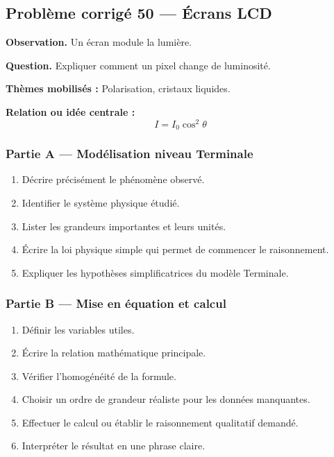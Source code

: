 \documentclass[11pt,a4paper]{article}
\begin{document}
\subsection{Problème corrigé 50 — Écrans LCD}

\begin{exercicebox}
\textbf{Observation.} Un écran module la lumière.

\medskip
\textbf{Question.} Expliquer comment un pixel change de luminosité.

\medskip
\textbf{Thèmes mobilisés :} Polarisation, cristaux liquides.

\medskip
\textbf{Relation ou idée centrale :}
\[
I=I_0\cos^2\theta
\]
\end{exercicebox}

\subsubsection*{Partie A — Modélisation niveau Terminale}

\begin{enumerate}
  \item Décrire précisément le phénomène observé.
  \item Identifier le système physique étudié.
  \item Lister les grandeurs importantes et leurs unités.
  \item Écrire la loi physique simple qui permet de commencer le raisonnement.
  \item Expliquer les hypothèses simplificatrices du modèle Terminale.
\end{enumerate}

\subsubsection*{Partie B — Mise en équation et calcul}

\begin{enumerate}
  \item Définir les variables utiles.
  \item Écrire la relation mathématique principale.
  \item Vérifier l'homogénéité de la formule.
  \item Choisir un ordre de grandeur réaliste pour les données manquantes.
  \item Effectuer le calcul ou établir le raisonnement qualitatif demandé.
  \item Interpréter le résultat en une phrase claire.
\end{enumerate}
\end{document}
